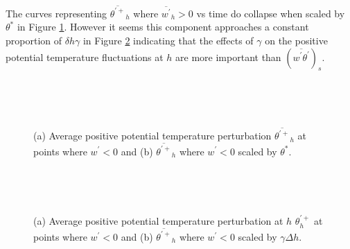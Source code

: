 \clearpage


The curves representing $\overline{\theta^{'+}}_{h}$ where $\overline{w^{'}}_{h}>0$ vs time do collapse when scaled by $\theta^{*}$ in Figure \ref{fig:downwarm_theta}.  However it seems this component approaches a constant proportion of $\delta h \gamma$ in Figure \ref{fig:downwarm_theta1} indicating that the effects of $\gamma$ on the positive potential temperature fluctuations at $h$ are more important than $(\overline{w^{'}\theta^{'}})_{s}$.\\ 

\begin{figure}[htbp]
\begin{minipage}[b]{0.5\linewidth}
        \\
        \end{minipage}             
\quad
\begin{minipage}[b]{0.5\linewidth}
        \\      
       \end{minipage}
        \caption[Positive potential temperature perturbation at $h$ (i)]{(a) Average positive potential temperature perturbation $\overline{\theta^{\prime+}}_{h}$ at points where $w^{\prime}<0$ and (b) $\overline{\theta^{\prime+}}_{h}$ where $w^{\prime}<0$ scaled by $\theta^{*}$.}
        \label{fig:downwarm_theta}
\end{figure}


\begin{figure}[htbp]
\begin{minipage}[b]{0.5\linewidth}
        \\
        \end{minipage}             
\quad
\begin{minipage}[b]{0.5\linewidth}
        \\      
       \end{minipage}
        \caption[Positive potential temperature perturbation at $h$ (ii)]{(a) Average positive potential temperature perturbation at $h$ $\theta^{\prime+}_{h}$ at points where $w^{\prime}<0$ and (b) $\overline{\theta^{\prime+}}_{h}$ where $w^{\prime}<0$ scaled by $\gamma \Delta h$.}
        \label{fig:downwarm_theta1}
\end{figure}

